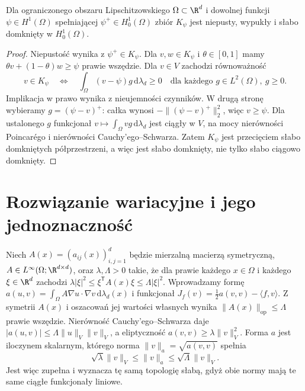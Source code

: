 \begin{lemat}
\label{lem:pde29-K}
Dla ograniczonego obszaru Lipschitzowskiego $\Omega\subset\R^d$
i dowolnej funkcji $\psi\in H^1(\Omega)$ spełniającej
$\psi^+\in H_0^1(\Omega)$ zbiór $K_\psi$ jest niepusty,
wypukły i słabo domknięty w $H_0^1(\Omega)$.
\end{lemat}
\begin{proof}
Niepustość wynika z $\psi^+\in K_\psi$.
Dla $v,w\in K_\psi$ i $\theta\in[0,1]$ mamy
$\theta v+(1-\theta)w\ge\psi$ prawie wszędzie.
Dla $v\in V$ zachodzi równoważność
\[
 v\in K_\psi\quad\Longleftrightarrow\quad
 \int_\Omega(v-\psi)g\,\mathrm d\lambda_d\ge0
 \quad\text{dla każdego }g\in L^2(\Omega),\ g\ge0.
\]
Implikacja w prawo wynika z nieujemności czynników.
W drugą stronę wybieramy $g=(\psi-v)^+$:
całka wynosi $-\|(\psi-v)^+\|_2^2$, więc $v\ge\psi$.
Dla ustalonego $g$ funkcjonał
$v\mapsto\int_\Omega vg\,\mathrm d\lambda_d$
jest ciągły w $V$, na mocy nierówności Poincarégo
i nierówności Cauchy'ego--Schwarza.
Zatem $K_\psi$ jest przecięciem słabo domkniętych
półprzestrzeni, a więc jest słabo domknięty,
nie tylko słabo ciągowo domknięty.
\end{proof}

\section{Rozwiązanie wariacyjne i jego jednoznaczność}
Niech $A(x)=(a_{ij}(x))_{i,j=1}^d$ będzie mierzalną macierzą
symetryczną, $A\in L^\infty(\Omega;\R^{d\times d})$, oraz
$\lambda,\Lambda>0$ takie, że dla prawie każdego $x\in\Omega$
i każdego $\xi\in\R^d$ zachodzi
$\lambda|\xi|^2\le\xi^{\mathsf T}A(x)\xi\le\Lambda|\xi|^2$.
Wprowadzamy formę $a(u,v)=\int_\Omega A\nabla u\cdot\nabla v\,
\mathrm d\lambda_d(x)$ i funkcjonał
$J_f(v)=\frac12a(v,v)-\langle f,v\rangle$.
Z symetrii $A(x)$ i oszacowań jej wartości własnych
wynika $\|A(x)\|_{\mathrm{op}}\le\Lambda$ prawie wszędzie.
Nierówność Cauchy'ego--Schwarza daje
$|a(u,v)|\le\Lambda\|u\|_V\|v\|_V$,
a eliptyczność $a(v,v)\ge\lambda\|v\|_V^2$.
Forma $a$ jest iloczynem skalarnym, którego norma
$\|v\|_a=\sqrt{a(v,v)}$ spełnia
\[
 \sqrt\lambda\|v\|_V\le\|v\|_a\le
 \sqrt\Lambda\|v\|_V.
\]
Jest więc zupełna i wyznacza tę samą topologię
słabą, gdyż obie normy mają te same ciągłe
funkcjonały liniowe.

